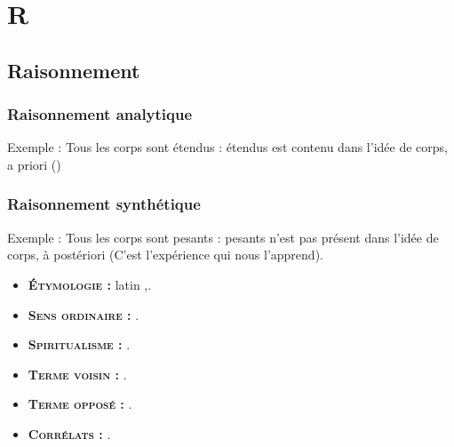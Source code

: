 \chapter{R}
\section{Raisonnement}

\subsection{Raisonnement analytique}

Exemple : Tous les corps sont étendus : étendus est contenu dans l'idée de corps, a priori ()

\subsection{Raisonnement synthétique}

Exemple : Tous les corps sont pesants :  pesants n'est pas présent dans l'idée de corps, à postériori (C'est l'expérience qui nous l'apprend).

{\footnotesize
\begin{itemize}[leftmargin=1cm, label=, itemsep=1pt]
\item {\bf \textsc{Étymologie} :} latin {\it },.
\item {\bf \textsc{Sens ordinaire} :} .
\item {\bf \textsc{Spiritualisme} :} .
\end{itemize}

\begin{itemize}[leftmargin=1cm, label=, itemsep=1pt]
\item {\bf \textsc{Terme voisin} :} .
\item {\bf \textsc{Terme opposé} :} .
\item {\bf \textsc{Corrélats} :} .
\end{itemize}
}
